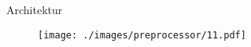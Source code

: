 \begin{frame}{Architektur}
    \begin{figure}
    	\centering
    	\texttt{[image: ./images/preprocessor/11.pdf]}
    \end{figure}
\end{frame}
